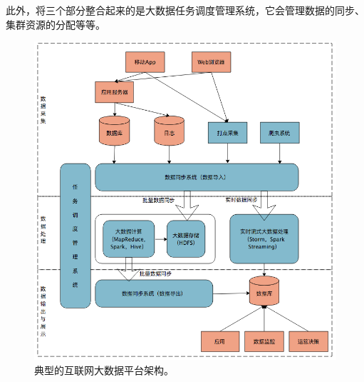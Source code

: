 \par 此外，将三个部分整合起来的是大数据任务调度管理系统，它会管理数据的同步、集群资源的分配等等。
\begin{figure}[ht]
	\centering
	\includegraphics[width=0.50\paperwidth]{img/introduction/big-data-framework.png}
	\caption{典型的互联网大数据平台架构。}
	\label{fig:frame}
\end{figure}

